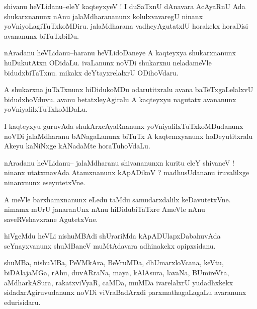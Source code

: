 \documentclass{article}
\begin{document}
\begin{mn}%
shivanu heVLidanu--eleY kaqteyxyeV ! I duSaTxnU dAnavara AcAyaRnU Ada shukarxnanunx nAnu 
jalaMdharananunx kolulxvavaregU ninanx yoVniyoLagiTuTxkoMDiru. jalaMdharana vadheyAgutatxlU 
horakekx horaDisi avananunx biTuTxbiDu.
\end{mn}

\begin{mn}%
nAradanu heVLidanu--haranu heVLidoDaneye A kaqteyxya shukarxnanunx huDukutAtxn ODidaLu. 
ivaLanunx noVDi shukarxnu neladameVle bidudxbiTaTxnu. mikakx deYtayxrelalxrU ODihoVdaru.
\end{mn}

\begin{mn}%
A shukarxna juTaTxnunx hiDidukoMDu odarutitxralu avana baTeTxgaLelalxvU bidudxhoVduvu. avanu 
betatxleyAgiralu A kaqteyxyu nagutatx avananunx yoVniyalilxTuTxkoMDaLu.
\end{mn}

\begin{mn}%
I kaqteyxyu guruvAda shukArxcAyaRnanunx yoVniyalilxTuTxkoMDudanunx noVDi jalaMdharanu 
bANagaLanunx biTuTx A kaqtemxyanunx hoDeyutitxralu Akeyu kaNiNxge kANadaMte horaTuhoVdaLu.
\end{mn}


\begin{mn}%
nAradanu heVLidanu-- jalaMdharanu shivananunxn kuritu eleY shivaneV ! ninanx utatxmavAda 
Atamxnanunx kApADikoV ? madhusUdananu iruvalilxge ninanxnunx eseyutetxVne.
\end{mn}

\begin{mn}%
A meVle barxhamxnanunx eLedu taMdu samudarxdalilx keDavutetxVne. nimamx mUrU janaranUnx nAnu 
hiDidubiTaTxre AmeVle nAnu saveRVshavxrane AgutetxVne.
\end{mn}

\begin{mn}%
hiVgeMdu heVLi nishuMBAdi shUrariMda kApADUlapxDabahuvAda seYnayxvanunx shuMBaneV 
muMtAdavara adhinakekx opipxsidanu.
\end{mn}

\begin{mn}%
shuMBa, nishuMBa, PeVMkAra, BeVruMDa, dhUmarxloVcana, keVtu, biDAlajaMGa, rAhu, duvARraNa, 
maya, kAlAsura, lavaNa, BUmireVta, aMdharkASura, rakatxviVyaR, caMDa, muMDa ivarelalxrU 
yudadhxkekx sidadxrAgiruvudanunx noVDi viVraBadArxdi parxmathagaLagaLu avaranunx edurisidaru.
\end{mn}
\end{document}
